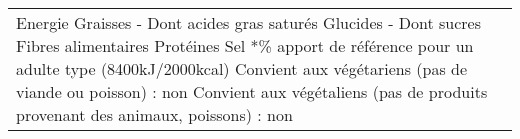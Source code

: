 \begin{tabular}{p{7cm}p{7cm}}
  \newline   \newline Energie  \newline   \newline   \newline Graisses  \newline   \newline   \newline - Dont acides gras saturés  \newline   \newline   \newline  Glucides  \newline   \newline   \newline - Dont sucres  \newline   \newline   \newline  Fibres alimentaires  \newline   \newline   \newline  Protéines  \newline   \newline Sel  \newline   \newline   \newline   \newline   \newline **\% apport de référence pour un adulte type (8400kJ/2000kcal)  \newline   \newline   \newline   \newline   \newline Convient aux végétariens (pas de viande ou poisson) : non  \newline Convient aux végétaliens (pas de produits provenant des animaux, poissons) : non  \\

\end{tabular}
